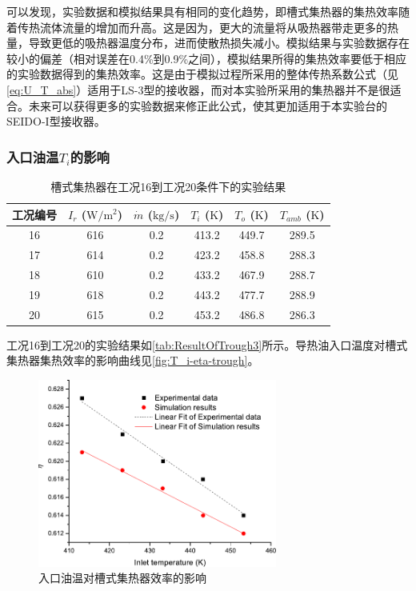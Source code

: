 可以发现，实验数据和模拟结果具有相同的变化趋势，即槽式集热器的集热效率随着传热流体流量的增加而升高。这是因为，更大的流量将从吸热器带走更多的热量，导致更低的吸热器温度分布，进而使散热损失减小。模拟结果与实验数据存在较小的偏差（相对误差在0.4\%到0.9\%之间），模拟结果所得的集热效率要低于相应的实验数据得到的集热效率。这是由于模拟过程所采用的整体传热系数公式（见\autoref{eq:U_T_abs}）适用于LS-3型的接收器，而对本实验所采用的集热器并不是很适合。未来可以获得更多的实验数据来修正此公式，使其更加适用于本实验台的SEIDO-I型接收器。

\subsubsection{入口油温$T_i$的影响}

\begin{table}[htbp]
\setlength{\abovecaptionskip}{0pt}
	\caption{槽式集热器在工况16到工况20条件下的实验结果}
	\centering
	\begin{tabular}{cccccc}
		\toprule
		工况编号	& $I_r$ ($\mathrm{W/m^2}$)	&	$\dot{m}$ ($\mathrm{kg/s}$)			&	$T_i$ ($\mathrm{K}$)	&	$T_o$ ($\mathrm{K}$)		&	$T_{amb}$ ($\mathrm{K}$)\\
		\midrule
		16	&	616	&	0.2	&	413.2	&	449.7	&	289.5\\
		17	&	614	&	0.2	&	423.2	&	458.8	&	288.3\\
		18	&	610	&	0.2	&	433.2	&	467.9	&	288.7	\\
		19	&	618	&	0.2	&	443.2	&	477.7	&	288.9\\
		20	&	615	&	0.2	&	453.2	&	486.8	&	286.3\\
		\bottomrule
	\end{tabular}
	\label{tab:ResultOfTrough3}
\end{table}
工况16到工况20的实验结果如\autoref{tab:ResultOfTrough3}所示。导热油入口温度对槽式集热器集热效率的影响曲线见\autoref{fig:T_i-eta-trough}。

\begin{figure}[!ht]
\centering
\includegraphics[width=0.7\textwidth]{fig/T_i-eta-trough}
\caption{入口油温对槽式集热器效率的影响}
\label{fig:T_i-eta-trough}
\end{figure}

